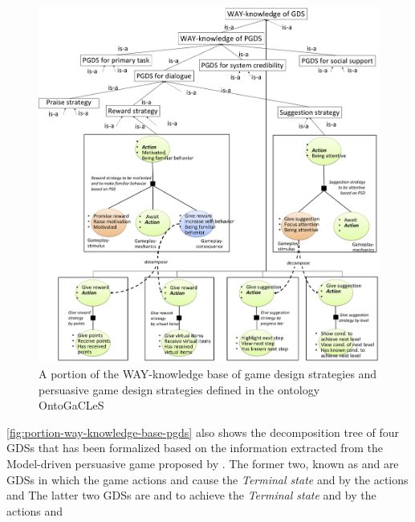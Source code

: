 \begin{figure}[!htb]
 \caption{A portion of the WAY-knowledge base of game design strategies and persuasive game design strategies defined in the ontology OntoGaCLeS}
 \label{fig:portion-way-knowledge-base-pgds}
 \centering
 \includegraphics[width=1\textwidth]{images/chap-ontogacles2/portion-way-knowledge-base-pgds.png}
 \fautor
\end{figure}

\autoref{fig:portion-way-knowledge-base-pgds} also shows the decomposition tree of four GDSs that has been formalized based on the information extracted from the Model-driven persuasive game proposed by .
The former two, known as  and  are GDSs in which the game actions  and  cause the \emph{Terminal state}  and  by the actions  and 
The latter two GDSs are  and  to achieve the \emph{Terminal state}   and  by the actions  and 

